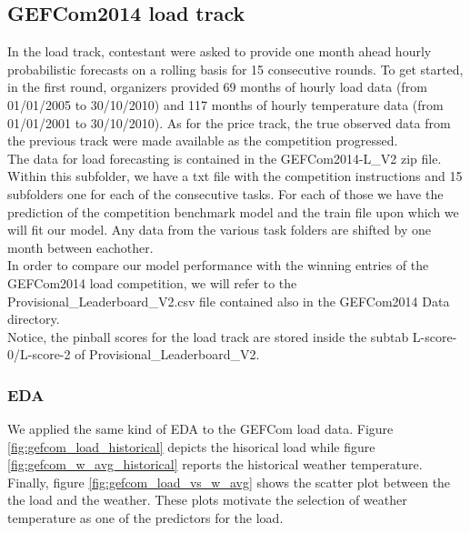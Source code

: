 \subsection{GEFCom2014 load track}
In the load track, contestant were asked to provide one month ahead hourly probabilistic forecasts on a rolling basis for 15 consecutive rounds. To get started, in the first round, organizers provided 69 months of hourly load data (from 01/01/2005 to 30/10/2010) and 117 months of hourly temperature data (from 01/01/2001 to 30/10/2010). 
As for the price track, the true observed data from the previous track were made available as the competition progressed.
\\
The data for load forecasting is contained in the GEFCom2014-L\_V2 zip file. Within this subfolder, we have a txt file with the competition instructions and 15 subfolders one for each of the consecutive tasks. For each of those we have the prediction of the competition benchmark model and the train file upon which we will fit our model.
Any data from the various task folders are shifted by one month between eachother.
\\
In order to compare our model performance with the winning entries of the GEFCom2014 load competition, we will refer to the Provisional\_Leaderboard\_V2.csv file contained also in the GEFCom2014 Data directory.
\\
Notice, the pinball scores for the load track are stored inside the subtab L-score-0/L-score-2 of Provisional\_Leaderboard\_V2.
\subsubsection{EDA}
We applied the same kind of EDA to the GEFCom load data. Figure \ref{fig:gefcom_load_historical} depicts the hisorical load while figure \ref{fig:gefcom_w_avg_historical} reports the historical weather temperature. Finally, figure \ref{fig:gefcom_load_vs_w_avg} shows the scatter plot between the the load and the weather.
These plots motivate the selection of weather temperature as one of the predictors for the load.

